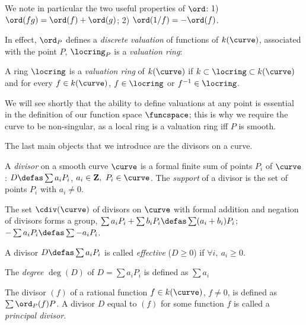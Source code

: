 We note in particular the two useful properties of $\ord$:
1) $\ord(fg) = \ord(f) + \ord(g)$; 2) $\ord(1/f) = -\ord(f)$.

In effect, $\ord_P$ defines a \emph{discrete valuation} of functions of $k(\curve)$, associated with the point $P$, \ie $\locring_P$ is a \emph{valuation ring}:

\begin{defi}
A ring $\locring$ is a \emph{valuation ring} of $k(\curve)$ if $k \subset \locring \subset k(\curve)$  and for every $f \in k(\curve)$,
$f \in \locring$ or $f^{-1} \in \locring$.
\end{defi}

We will see shortly that the ability to define valuations at any point is essential
in the definition of our function space $\funcspace$; this is why we require the curve to be non-singular, as a local ring is a valuation ring iff $P$ is smooth.

\medskip

The last main objects that we introduce are the divisors on a curve.

\begin{defi}[Divisor]
A \emph{divisor} on a smooth curve $\curve$ is a formal finite sum of points $P_i$ of $\curve$: $D \defas \sum a_iP_i$, $a_i \in \mathbf{Z},~P_i \in \curve$.
The \emph{support} of a divisor is the set of points $P_i$ with $a_i \neq 0$.

\noindent
The set $\cdiv(\curve)$ of divisors on $\curve$ with formal addition and negation of divisors forms a group, \ie $\sum a_iP_i + \sum b_iP_i \defas \sum (a_i+b_i)P_i$;
$-\sum a_iP_i \defas \sum -a_iP_i$.

\noindent
A divisor $D \defas \sum a_iP_i$ is called \emph{effective} ($D \geq 0$) if $\forall i,~a_i \geq 0$.

\noindent
The \emph{degree} $\deg(D)$ of $D = \sum a_iP_i$ is defined as $\sum a_i$
\end{defi}

\begin{defi}
The divisor $(f)$ of a rational function $f \in k(\curve)$, $f \neq 0$, is defined as $\sum \ord_P(f)P$.
A divisor $D$ equal to $(f)$ for some function $f$ is called a \emph{principal divisor}.
\end{defi}

